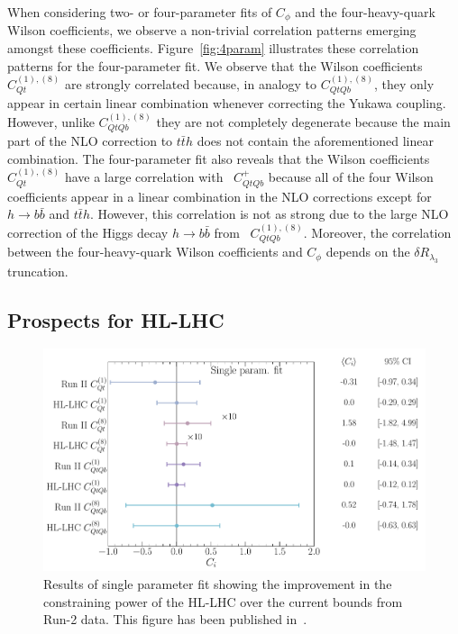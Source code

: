 %
When considering two- or four-parameter fits of $C_\phi$ and the four-heavy-quark Wilson coefficients, we observe a non-trivial correlation patterns emerging amongst these coefficients.  Figure~\ref{fig:4param} illustrates these correlation patterns for the four-parameter fit. 
We observe that the Wilson coefficients $C_{Qt}^{(1),(8) }$ are strongly correlated because, in analogy to $C_{QtQb}^{(1),(8) }$, they only appear in certain linear combination whenever correcting the Yukawa coupling. However,  unlike $C_{QtQb}^{(1),(8) }$ they are not completely degenerate because the main part of the NLO correction to $t\bar t h$ does not contain the aforementioned linear combination.  The four-parameter fit also reveals that the Wilson coefficients~$C_{Qt}^{(1),(8) }$ have a large correlation with ~$C_{QtQb}^{+}$ because all of the four Wilson coefficients appear in a linear combination in the NLO corrections except for $ h\to b\bar b$ and $ t\bar{t} h$. However, this correlation is not as strong due to the large NLO correction of the Higgs decay $h \to b \bar b$ from ~$C_{QtQb}^{(1),(8) }$. Moreover, the correlation between the four-heavy-quark Wilson coefficients  and $C_{\phi}$ depends on the $\delta R_{\lambda_3}$ truncation. 

\subsection{Prospects for HL-LHC}
\begin{figure}[t!]
	\begin{center}
		\includegraphics[width=0.75\linewidth]{fig/uebeblick_forest_ci}
	\end{center}
	\caption{ Results of single parameter fit showing the improvement in the constraining power of the HL-LHC over the current bounds from Run-2 data.  This figure has been published in~\cite{Alasfar:2022zyr}. \label{fig:HLLHC} }
\end{figure}

